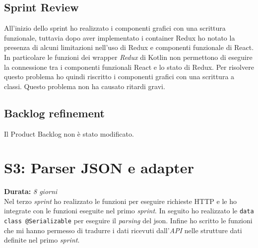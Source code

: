 \subsection{Sprint Review}
All'inizio dello sprint ho realizzato i componenti grafici con una scrittura funzionale, tuttavia dopo aver implementato i container Redux ho notato la presenza di alcuni limitazioni nell'uso di Redux e componenti funzionale di React. In particolare le funzioni dei wrapper \emph{Redux} di Kotlin non permettono di eseguire la connessione tra i componenti funzionali React e lo stato di Redux. Per risolvere questo problema ho quindi riscritto i componenti grafici con una scrittura a classi. Questo problema non ha causato ritardi gravi. 

\subsection{Backlog refinement}
Il Product Backlog non è stato modificato.

\newpage

\section{S3: Parser JSON e adapter}
\textbf{Durata:} \textit{8 giorni} \\
Nel terzo \emph{sprint} ho realizzato le funzioni per eseguire richieste HTTP e le ho integrate con le funzioni eseguite nel primo \emph{sprint}. In seguito ho realizzato le \verb|data class @Serializable| per eseguire il \emph{parsing} del json. Infine ho scritto le funzioni che mi hanno permesso di tradurre i dati ricevuti dall'\emph{API} nelle strutture dati definite nel primo \emph{sprint}.
 
